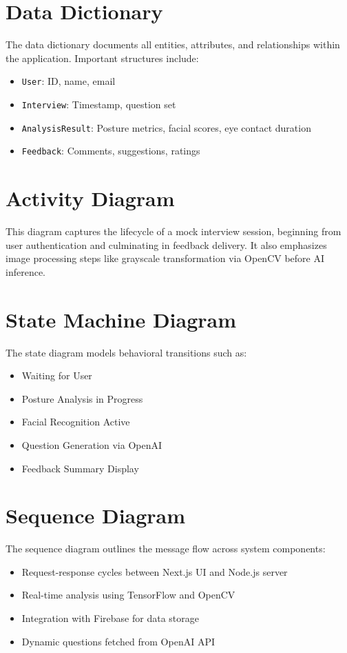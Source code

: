 \section{Data Dictionary}
The data dictionary documents all entities, attributes, and relationships within the application. Important structures include:
\begin{itemize}
    \item \texttt{User}: ID, name, email
    \item \texttt{Interview}: Timestamp, question set
    \item \texttt{AnalysisResult}: Posture metrics, facial scores, eye contact duration
    \item \texttt{Feedback}: Comments, suggestions, ratings
\end{itemize}

\section{Activity Diagram}
This diagram captures the lifecycle of a mock interview session, beginning from user authentication and culminating in feedback delivery. It also emphasizes image processing steps like grayscale transformation via OpenCV before AI inference.

\section{State Machine Diagram}
The state diagram models behavioral transitions such as:
\begin{itemize}
    \item Waiting for User
    \item Posture Analysis in Progress
    \item Facial Recognition Active
    \item Question Generation via OpenAI
    \item Feedback Summary Display
\end{itemize}

\section{Sequence Diagram}
The sequence diagram outlines the message flow across system components:
\begin{itemize}
    \item Request-response cycles between Next.js UI and Node.js server
    \item Real-time analysis using TensorFlow and OpenCV
    \item Integration with Firebase for data storage
    \item Dynamic questions fetched from OpenAI API
\end{itemize}

